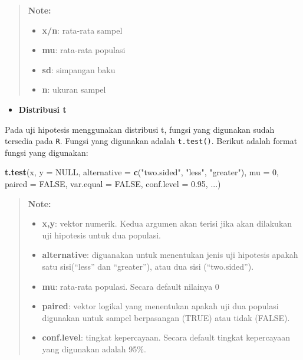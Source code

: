 \documentclass[]{book}
\newenvironment{Shaded}{\begin{snugshade}}{\end{snugshade}}
\newcommand{\KeywordTok}[1]{\textcolor[rgb]{0.13,0.29,0.53}{\textbf{#1}}}
\newcommand{\DataTypeTok}[1]{\textcolor[rgb]{0.13,0.29,0.53}{#1}}
\newcommand{\DecValTok}[1]{\textcolor[rgb]{0.00,0.00,0.81}{#1}}
\newcommand{\FloatTok}[1]{\textcolor[rgb]{0.00,0.00,0.81}{#1}}
\newcommand{\StringTok}[1]{\textcolor[rgb]{0.31,0.60,0.02}{#1}}
\newcommand{\OtherTok}[1]{\textcolor[rgb]{0.56,0.35,0.01}{#1}}
\newcommand{\NormalTok}[1]{#1}
\providecommand{\tightlist}{%
  \setlength{\itemsep}{0pt}\setlength{\parskip}{0pt}}
\begin{document}
\begin{quote}
\textbf{Note: }

\begin{itemize}
\tightlist
\item
  \textbf{x/n}: rata-rata sampel
\item
  \textbf{mu}: rata-rata populasi
\item
  \textbf{sd}: simpangan baku
\item
  \textbf{n}: ukuran sampel
\end{itemize}
\end{quote}

\begin{itemize}
\tightlist
\item
  \textbf{Distribusi t}
\end{itemize}

Pada uji hipotesis menggunakan distribusi t, fungsi yang digunakan sudah
tersedia pada \texttt{R}. Fungsi yang digunakan adalah
\texttt{t.test()}. Berikut adalah format fungsi yang digunakan:

\begin{Shaded}
\begin{Highlighting}[]
\KeywordTok{t.test}\NormalTok{(x, }\DataTypeTok{y =} \OtherTok{NULL}\NormalTok{,}
       \DataTypeTok{alternative =} \KeywordTok{c}\NormalTok{(}\StringTok{"two.sided"}\NormalTok{, }\StringTok{"less"}\NormalTok{, }\StringTok{"greater"}\NormalTok{),}
       \DataTypeTok{mu =} \DecValTok{0}\NormalTok{, }\DataTypeTok{paired =} \OtherTok{FALSE}\NormalTok{, }\DataTypeTok{var.equal =} \OtherTok{FALSE}\NormalTok{,}
       \DataTypeTok{conf.level =} \FloatTok{0.95}\NormalTok{, ...)}
\end{Highlighting}
\end{Shaded}

\begin{quote}
\textbf{Note: }

\begin{itemize}
\tightlist
\item
  \textbf{x,y}: vektor numerik. Kedua argumen akan terisi jika akan
  dilakukan uji hipotesis untuk dua populasi.
\item
  \textbf{alternative}: diguanakan untuk menentukan jenis uji hipotesis
  apakah satu sisi(``less'' dan ``greater''), atau dua sisi
  (``two.sided'').
\item
  \textbf{mu}: rata-rata populasi. Secara default nilainya 0
\item
  \textbf{paired}: vektor logikal yang menentukan apakah uji dua
  populasi digunakan untuk sampel berpasangan (TRUE) atau tidak (FALSE).
\item
  \textbf{conf.level}: tingkat kepercayaan. Secara default tingkat
  kepercayaan yang digunakan adalah 95\%.
\end{itemize}
\end{quote}
\end{document}
